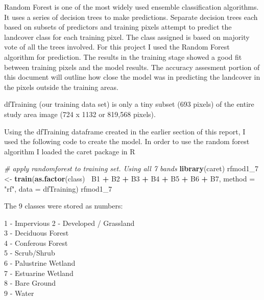 \documentclass[]{article}
\newenvironment{Shaded}{\begin{snugshade}}{\end{snugshade}}
\newcommand{\KeywordTok}[1]{\textcolor[rgb]{0.13,0.29,0.53}{\textbf{#1}}}
\newcommand{\DataTypeTok}[1]{\textcolor[rgb]{0.13,0.29,0.53}{#1}}
\newcommand{\DecValTok}[1]{\textcolor[rgb]{0.00,0.00,0.81}{#1}}
\newcommand{\StringTok}[1]{\textcolor[rgb]{0.31,0.60,0.02}{#1}}
\newcommand{\CommentTok}[1]{\textcolor[rgb]{0.56,0.35,0.01}{\textit{#1}}}
\newcommand{\OperatorTok}[1]{\textcolor[rgb]{0.81,0.36,0.00}{\textbf{#1}}}
\newcommand{\NormalTok}[1]{#1}
\begin{document}
Random Forest is one of the most widely used ensemble classification
algorithms. It uses a series of decision trees to make predictions.
Separate decision trees each based on subsets of predictors and training
pixels attempt to predict the landcover class for each training pixel.
The class assigned is based on majority vote of all the trees involved.
For this project I used the Random Forest algorithm for prediction. The
results in the training stage showed a good fit between training pixels
and the model results. The accuracy assesment portion of this document
will outline how close the model was in predicting the landcover in the
pixels outside the training areas.

dfTraining (our training data set) is only a tiny subset (693 pixels) of
the entire study area image (724 x 1132 or 819,568 pixels).

Using the dfTraining dataframe created in the earlier section of this
report, I used the following code to create the model. In order to use
the random forest algorithm I loaded the caret package in R

\begin{Shaded}
\begin{Highlighting}[]
\CommentTok{# apply randomforest to training set.  Using all 7 bands  }
\KeywordTok{library}\NormalTok{(caret)}
\NormalTok{rfmod1_}\DecValTok{7}\NormalTok{ <-}\StringTok{ }\KeywordTok{train}\NormalTok{(}\KeywordTok{as.factor}\NormalTok{(class)}\OperatorTok{~}\StringTok{ }\NormalTok{B1 }\OperatorTok{+}\StringTok{ }\NormalTok{B2 }\OperatorTok{+}\StringTok{ }\NormalTok{B3 }\OperatorTok{+}\StringTok{ }\NormalTok{B4 }\OperatorTok{+}\StringTok{ }\NormalTok{B5 }\OperatorTok{+}\StringTok{ }\NormalTok{B6 }\OperatorTok{+}\StringTok{ }\NormalTok{B7, }\DataTypeTok{method =} \StringTok{"rf"}\NormalTok{, }\DataTypeTok{data =}\NormalTok{ dfTraining)}
\NormalTok{rfmod1_}\DecValTok{7}
\end{Highlighting}
\end{Shaded}

The 9 classes were stored as numbers:

1 - Impervious 2 - Developed / Grassland\\
3 - Deciduous Forest\\
4 - Conferous Forest\\
5 - Scrub/Shrub\\
6 - Palustrine Wetland\\
7 - Estuarine Wetland\\
8 - Bare Ground\\
9 - Water
\end{document}
